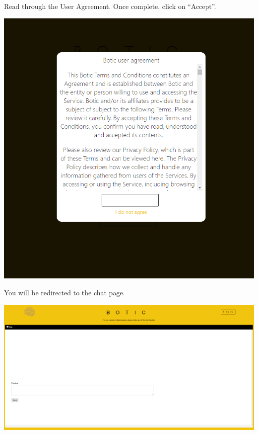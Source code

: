 \documentclass[11pt]{article}
\begin{document}
\begin{flushleft}
	Read through the User Agreement. Once complete, click on “Accept”.
\end{flushleft}
\includegraphics[width=1.0\textwidth]{images/UserAgreement.png}

\begin{flushleft}
	You will be redirected to the chat page.
\end{flushleft}
\includegraphics[width=1.0\textwidth]{images/ChatPage.png}
\end{document}

